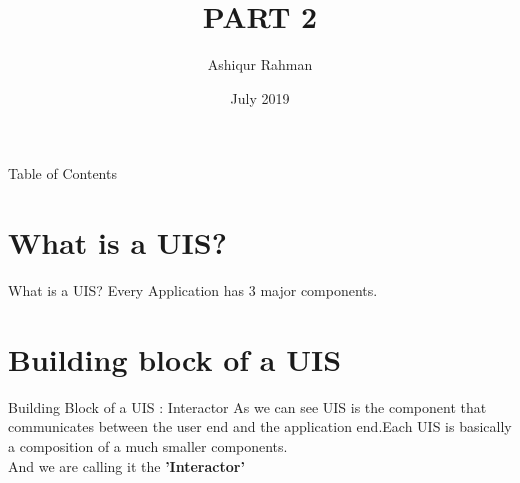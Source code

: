 \documentclass{beamer}
\title[beamer]{PART 2}
\author{Ashiqur Rahman}
\date{July 2019}
\begin{document}
\maketitle

\begin{frame}{Table of Contents}
    \tableofcontents
\end{frame}

\section{What is a UIS?}
\begin{frame}{What is a UIS?}
   	Every Application has 3 major components.
   	\begin{figure}[h]
    	\centering
    \end{figure}
\end{frame}

\section{Building block of a UIS}
\begin{frame}{Building Block of a UIS : Interactor}
	As we can see UIS is the component that communicates between the user end and the application end.Each UIS is basically a composition of a much smaller components.\\
	 And we are calling it the \textbf{'Interactor'}   
\end{frame}
\end{document}

